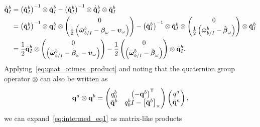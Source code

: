 \begin{align}
  \dot{\tilde{\boldsymbol{\mathrm{q}}}}_I^b &=
  \left( \hat{\boldsymbol{\mathrm{q}}}_I^b \right)^{-1} \otimes \dot{\boldsymbol{\mathrm{q}}}_I^b  - \left( \hat{\boldsymbol{\mathrm{q}}}_I^b
  \right)^{-1} \otimes \dot{\hat{\boldsymbol{\mathrm{q}}}}_I^b \otimes \tilde{\boldsymbol{\mathrm{q}}}_I^b
  \\
  &=
  \left( \hat{\boldsymbol{\mathrm{q}}}_I^b \right)^{-1} \otimes \boldsymbol{\mathrm{q}}_I^b \otimes
  \begin{pmatrix}
    0 \\
    \frac{1}{2} \left( \bar{\boldsymbol{\mathrm{\omega}}}_{b/I}^b - \boldsymbol{\mathrm{\beta}}_\omega
    -\boldsymbol{\mathrm{\upsilon}}_\omega \right)
  \end{pmatrix}
  - \left( \hat{\boldsymbol{\mathrm{q}}}_I^b
  \right)^{-1} \otimes \hat{\boldsymbol{\mathrm{q}}}_I^b \otimes
  \begin{pmatrix}
    0 \\
    \frac{1}{2} \left( \bar{\boldsymbol{\mathrm{\omega}}}_{b/I}^b - \hat{\boldsymbol{\mathrm{\beta}}}_\omega
    \right)
  \end{pmatrix}
  \otimes \tilde{\boldsymbol{\mathrm{q}}}_I^b
  \\
  &=
  \label{eq:intermed_eq1}
  \frac{1}{2} \tilde{\boldsymbol{\mathrm{q}}}_I^b \otimes
  \begin{pmatrix}
    0 \\
    \left( \bar{\boldsymbol{\mathrm{\omega}}}_{b/I}^b - \boldsymbol{\mathrm{\beta}}_\omega -
    \boldsymbol{\mathrm{\upsilon}}_\omega \right)
  \end{pmatrix}
  - \frac{1}{2}
  \begin{pmatrix}
    0 \\
    \left( \bar{\boldsymbol{\mathrm{\omega}}}_{b/I}^b - \hat{\boldsymbol{\mathrm{\beta}}}_\omega \right)
  \end{pmatrix}
  \otimes \tilde{\boldsymbol{\mathrm{q}}}_I^b.
\end{align}
Applying~\eqref{eq:quat_otimes_product} and noting that the quaternion group
operator $\otimes$ can also be written as
\begin{equation}
	\boldsymbol{\mathrm{q}}^a \otimes \boldsymbol{\mathrm{q}}^b = \begin{pmatrix} q_0^b & \left(-\bar{\boldsymbol{\mathrm{q}}}^{b}\right)^{\mathsf{T}} \\ \bar{\boldsymbol{\mathrm{q}}}^b & q^b_0 I - \left[ \bar{\boldsymbol{\mathrm{q}}}^b \right]_{\times} \end{pmatrix}
	\begin{pmatrix} q^a \\ \bar{\boldsymbol{\mathrm{q}}}^a \end{pmatrix},
\end{equation}
we can expand~\eqref{eq:intermed_eq1} as matrix-like products
